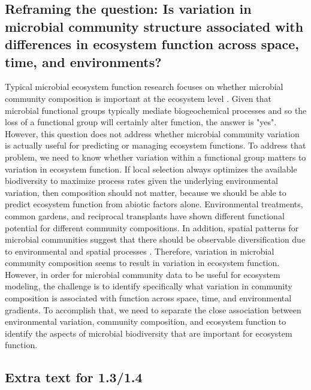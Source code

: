 \documentclass{article}
\begin{document}
\subsection{Reframing the question: Is variation in microbial community
structure associated with differences in ecosystem function across space,
time, and environments?}

Typical microbial ecosystem function research focuses on whether microbial
community composition is important at the ecosystem level
\citep{schimel1998, cavigelli2000, balser2005, graham2016}. Given that
microbial functional groups typically mediate biogeochemical processes
and so the loss of a functional group will certainly alter function,
the answer is "yes". However, this question does not address whether
microbial community variation is actually useful for predicting or 
managing ecosystem functions. To address that problem, we need to know
whether variation within a functional group matters to variation in
ecosystem function. If local selection always optimizes the available
biodiversity to maximize process rates given the underlying environmental
variation, then composition should not matter, because we should be able
to predict ecosystem function from abiotic factors alone. Environmental
treatments, common gardens, and reciprocal transplants have shown
different functional potential for different community compositions.
In addition, spatial patterns for microbial communities suggest that
there should be observable diversification due to environmental and
spatial processes \citep{wright1943, martiny2006}. Therefore, variation
in microbial community composition seems to result in variation in 
ecosystem function. However, in order for microbial community data to be
useful for ecosystem modeling, the challenge is to identify specifically what variation in community composition
is associated with function across space, time, and environmental gradients.
To accomplish that, we need to separate the close association between environmental variation, community
composition, and ecosystem function to identify the aspects of microbial
biodiversity that are important for ecosystem function.

\subsection*{Extra text for 1.3/1.4}
\end{document}
